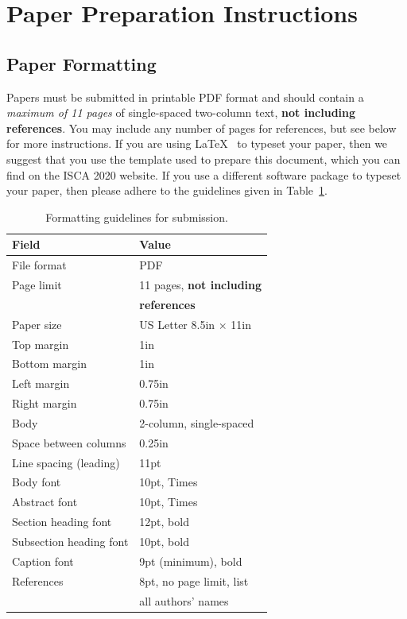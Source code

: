 \documentclass[conference]{IEEEtran}
\begin{document}
\section{Paper Preparation Instructions}

\subsection{Paper Formatting}
Papers must be submitted in printable PDF format and should contain a
{\em maximum of 11 pages} of single-spaced two-column text, {\bf not
  including references}.  You may include any number of pages for
references, but see below for more instructions.  If you are using
\LaTeX~\cite{lamport94} to typeset your paper, then we suggest that
you use the template used to prepare this document, which you can find
on the ISCA 2020 website. If you use a different
software package to typeset your paper, then please adhere to the
guidelines given in Table~\ref{table:formatting}.  

\begin{scriptsize}
\begin{table}[h!]
  \centering
  \caption{Formatting guidelines for submission.}
  \label{table:formatting}
  \begin{tabular}{|l|l|}
    \hline
    \textbf{Field} & \textbf{Value}\\
    \hline
    \hline
    File format & PDF \\
    \hline
    Page limit & 11 pages, {\bf not including}\\
               & {\bf references}\\
    \hline
    Paper size & US Letter 8.5in $\times$ 11in\\
    \hline
    Top margin & 1in\\
    \hline
    Bottom margin & 1in\\
    \hline
    Left margin & 0.75in\\
    \hline
    Right margin & 0.75in\\
    \hline
    Body & 2-column, single-spaced\\
    \hline
    Space between columns & 0.25in\\
    \hline
    Line spacing (leading) & 11pt \\
    \hline
    Body font & 10pt, Times\\
    \hline
    Abstract font & 10pt, Times\\
    \hline
    Section heading font & 12pt, bold\\
    \hline
    Subsection heading font & 10pt, bold\\
    \hline
    Caption font & 9pt (minimum), bold\\
    \hline
    References & 8pt, no page limit, list \\
               & all authors' names\\
    \hline
  \end{tabular}
\end{table}
\end{scriptsize}
\end{document}

